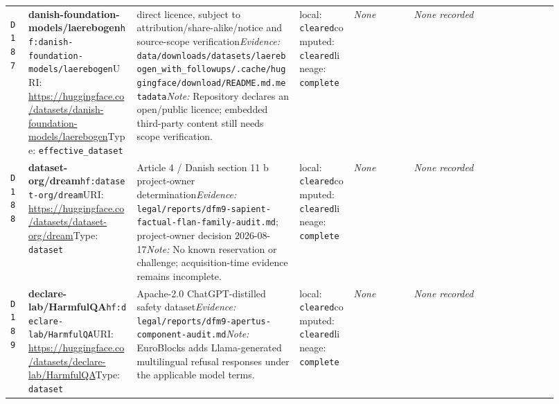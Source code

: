 \documentclass[9pt,a4paper]{article}
\newcommand{\depid}[1]{\hypertarget{dep:#1}{\texttt{#1}}}
\begin{document}
\begin{landscape}
\begin{longtable}{@{}L{0.035\linewidth}L{0.185\linewidth}L{0.27\linewidth}L{0.09\linewidth}L{0.10\linewidth}L{0.24\linewidth}@{}}
\depid{D187} & \textbf{danish-foundation-models/laerebogen}\newline \nolinkurl{hf:danish-foundation-models/laerebogen}\newline URI: \url{https://huggingface.co/datasets/danish-foundation-models/laerebogen}\newline Type: \texttt{effective\_dataset} & direct licence, subject to attribution/share-alike/notice and source-scope verification\newline \textit{Evidence:} \nolinkurl{data/downloads/datasets/laerebogen_with_followups/.cache/huggingface/download/README.md.metadata}\newline \textit{Note:} Repository declares an open/public licence; embedded third-party content still needs scope verification. & local: \texttt{cleared}\newline computed: \texttt{cleared}\newline lineage: \texttt{complete} & \textit{None} & \textit{None recorded} \\
\depid{D188} & \textbf{dataset-org/dream}\newline \nolinkurl{hf:dataset-org/dream}\newline URI: \url{https://huggingface.co/datasets/dataset-org/dream}\newline Type: \texttt{dataset} & Article 4 / Danish section 11 b project-owner determination\newline \textit{Evidence:} \nolinkurl{legal/reports/dfm9-sapient-factual-flan-family-audit.md}; project-owner decision 2026-08-17\newline \textit{Note:} No known reservation or challenge; acquisition-time evidence remains incomplete. & local: \texttt{cleared}\newline computed: \texttt{cleared}\newline lineage: \texttt{complete} & \textit{None} & \textit{None recorded} \\
\depid{D189} & \textbf{declare-lab/HarmfulQA}\newline \nolinkurl{hf:declare-lab/HarmfulQA}\newline URI: \url{https://huggingface.co/datasets/declare-lab/HarmfulQA}\newline Type: \texttt{dataset} & Apache-2.0 ChatGPT-distilled safety dataset\newline \textit{Evidence:} \nolinkurl{legal/reports/dfm9-apertus-component-audit.md}\newline \textit{Note:} EuroBlocks adds Llama-generated multilingual refusal responses under the applicable model terms. & local: \texttt{cleared}\newline computed: \texttt{cleared}\newline lineage: \texttt{complete} & \textit{None} & \textit{None recorded} \\

\end{longtable}
\end{landscape}
\end{document}
